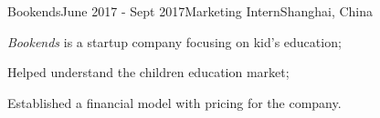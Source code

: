 \ifx\lang\eng
	\begin{rSubsection}{Bookends}{June 2017 - Sept 2017}{Marketing Intern}{Shanghai, China}
		\item \textit{Bookends} is a startup company focusing on kid's education;
		\item Helped understand the children education market;
		\item Established a financial model with pricing for the company.
	\end{rSubsection}
\fi